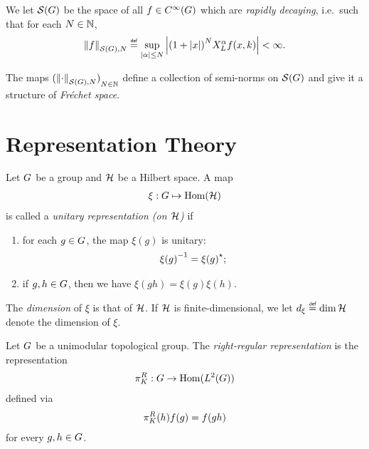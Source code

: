 \begin{definition}
    We let $\Schwartz\Group$ be the space of all $f \in \SmoothFunctions\Group$
    which are \emph{rapidly decaying},
    i.e.\ such that for each $N \in \N$,
    \begin{align*}
        \seminorm[\Schwartz\Group]{N}{f} \defeq
        \sup_{\abs\alpha \leq N}
        \abs{%
            {(1 + \abs{x})}^N
            \LeftDifferentialOperator{\alpha} f(x, k)
        }
        < \infty.
    \end{align*}

    The maps ${(\seminorm[\Schwartz\Group]{N}{\dummy})}_{N \in \N}$ define a collection of semi-norms on $\Schwartz\Group$
    and give it a structure of \emph{Fr\'echet space}.
\end{definition}

\section{Representation Theory}

\begin{definition}
\label{definition:unitary_representation}
    Let $\Group$ be a group and $\Hil$ be a Hilbert space.
    A map
    \begin{align*}
        \xi : \Group \mapsto \Hom(\Hil)
    \end{align*}
    is called a \emph{unitary representation (on $\Hil$)} if
    \begin{enumerate}
        \item for each $g \in \Group$, the map $\xi(g)$ is unitary:
            \begin{align*}
                {\xi(g)}^{-1} = \adj{\xi(g)};
            \end{align*}
        \item if $g, h \in \Group$, then we have $\xi(g h) = \xi(g) \xi(h)$.
    \end{enumerate}

    The \emph{dimension} of $\xi$ is that of $\Hil$.
    If $\Hil$ is finite-dimensional,
    we let $\dimRep{\xi} \defeq \dim{\Hil}$ denote the dimension of $\xi$.
\end{definition}

\begin{example}
    Let $\Group$ be a unimodular topological group.
    The \emph{right-regular representation} is the representation
    \begin{align*}
        \RightRegularRepresentation : \Group \to \Hom(\Lebesgue{2}{\Group})
    \end{align*}
    defined via
    \begin{align*}
        \RightRegularRepresentation(h) f(g) = f(g h)
    \end{align*}
    for every $g, h \in \Group$.
\end{example}

